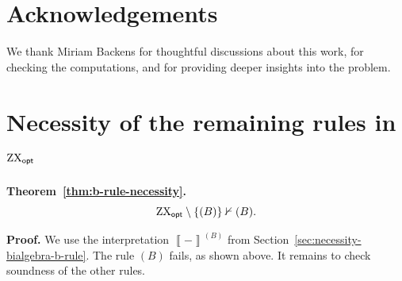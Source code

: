 \documentclass[copyright,creativecommons]{eptcs}
\newcommand{\zxopt}{\ensuremath{\textup{ZX}_{\textsf{opt}}}\xspace}
\newcommand{\sem}[1]{\left\llbracket #1 \right\rrbracket}
\theoremstyle{definition}
\theoremstyle{remark}
\begin{document}


\section*{Acknowledgements}

We thank Miriam Backens for thoughtful discussions about this work, for checking the computations, and for providing deeper insights into the problem.




\appendix


\section{Necessity of the remaining rules in \texorpdfstring{\(\zxopt\)}{ZXopt}}
\label{app:b-rule-soundness-checks}

\noindent\textbf{Theorem~\ref{thm:b-rule-necessity}.}
\[
\zxopt\setminus\{(B)\}\nvdash (B).
\]

\noindent\textbf{Proof.}
We use the interpretation \(\sem{-}^{(B)}\) from Section~\ref{sec:necessity-bialgebra-b-rule}.
The rule \((B)\) fails, as shown above.
It remains to check soundness of the other rules.
\end{document}
